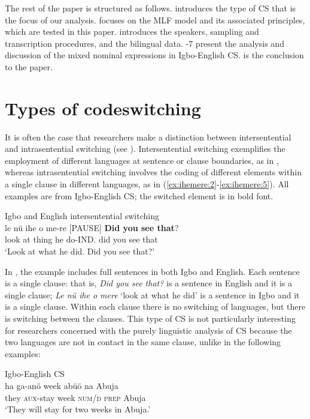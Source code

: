 \documentclass[output=paper]{langsci/langscibook}
\begin{document}
The rest of the paper is structured as follows.  introduces the type of CS that is the focus of our analysis.  focuses on the MLF model and its associated principles, which are tested in this paper.  introduces the speakers, sampling and transcription procedures, and the bilingual data. -7 present the analysis and discussion of the mixed nominal expressions in Igbo-English CS.  is the conclusion to the paper.  

\section{Types of codeswitching}

It is often the case that researchers make a distinction between intersentential and intrasentential switching (see \citealt{Clyne2003}). Intersentential switching exemplifies the employment of different languages at sentence or clause boundaries, as in , whereas intrasentential switching involves the coding of different elements within a single clause in different languages, as in (\ref{ex:ihemere:2}-\ref{ex:ihemere:5}). All examples are from Igbo-English CS; the switched element is in bold font.

\ea
{Igbo and English intersentential switching\rmfnm{}}\\
\gll le    nü  ihe  o   me-re    [PAUSE] \textbf{Did you see that}?\\
     look  at  thing  he do-IND.                did  you see that\\
\glt ‘Look at what he did. Did you see that?’
\z
{}


In , the example includes full sentences in both Igbo and English. Each sentence is a single clause: that is, \textit{Did you see that?} is a sentence in English and it is a single clause; \textit{Le nü ihe o mere} ‘look at what he did’ is a sentence in Igbo and it is a single clause. Within each clause there is no switching of languages, but there is switching between the clauses. This type of CS is not particularly interesting for researchers concerned with the purely linguistic analysis of CS because the two languages are not in contact in the same clause, unlike in the following examples:


\ea
{Igbo-English \textsc{CS}}\\
\gll ha    ga-anö     week  abüö  na  Abuja\\
     they  \textsc{aux}-stay  week  \textsc{num/d}  \textsc{prep} Abuja\\
\glt ‘They will stay for two weeks in Abuja.’
\z
\end{document}
